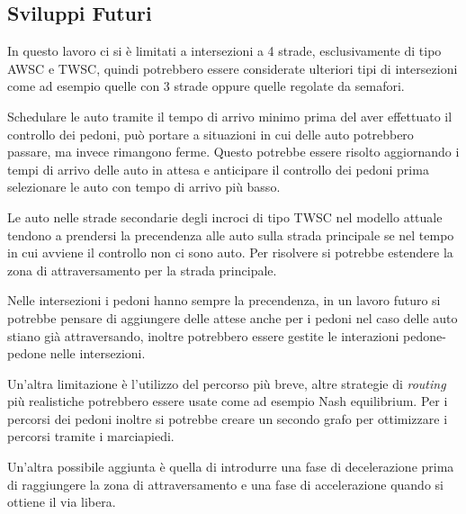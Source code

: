 \subsection{Sviluppi Futuri}
In questo lavoro ci si è limitati a intersezioni a 4 strade, esclusivamente di tipo AWSC e TWSC, quindi potrebbero essere considerate
ulteriori tipi di intersezioni come ad esempio quelle con 3 strade oppure quelle regolate da semafori.

Schedulare le auto tramite il tempo di arrivo minimo prima del aver effettuato il controllo dei pedoni,
può portare a situazioni in cui delle auto potrebbero passare, ma invece rimangono ferme.
Questo potrebbe essere risolto aggiornando i tempi di arrivo delle auto in attesa e anticipare il controllo dei pedoni prima
selezionare le auto con tempo di arrivo più basso.

Le auto nelle strade secondarie degli incroci di tipo TWSC nel modello attuale tendono a prendersi la precendenza alle auto sulla strada principale se nel tempo in cui
avviene il controllo non ci sono auto. Per risolvere si potrebbe estendere la zona di attraversamento per la strada principale.

Nelle intersezioni i pedoni hanno sempre la precendenza, in un lavoro futuro si potrebbe pensare di aggiungere delle attese anche per i pedoni
nel caso delle auto stiano già attraversando, inoltre potrebbero essere gestite le interazioni pedone-pedone nelle intersezioni.

Un'altra limitazione è l'utilizzo del percorso più breve, altre strategie di \textit{routing} più realistiche potrebbero essere usate come ad esempio Nash equilibrium.
Per i percorsi dei pedoni inoltre si potrebbe creare un secondo grafo per ottimizzare i percorsi tramite i marciapiedi.

Un'altra possibile aggiunta è quella di introdurre una fase di decelerazione prima di raggiungere la zona di attraversamento e una fase
di accelerazione quando si ottiene il via libera.
